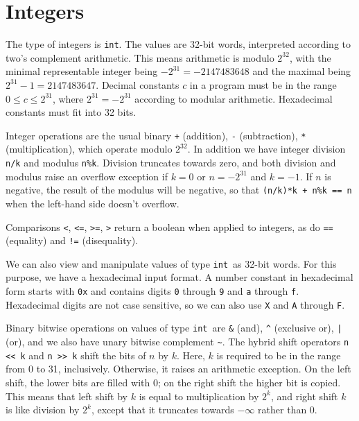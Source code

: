 \documentclass[11pt]{article}
\newcommand{\tint}{\texttt{int}}
\begin{document}
\section{Integers}

The type of integers is \tint.  The values are 32-bit words,
interpreted according to two's complement arithmetic.  This means
arithmetic is modulo $2^{32}$, with the minimal representable integer
being $-2^{31} = -2147483648$ and the maximal being $2^{31}-1 = 2147483647$.
Decimal constants $c$ in a program must be in the range $0 \leq c
\leq 2^{31}$, where $2^{31} = -2^{31}$ according to modular
arithmetic.  Hexadecimal constants must fit into 32 bits.

Integer operations are the usual binary \lstinline'+' (addition), \lstinline'-'
(subtraction), \lstinline'*' (multiplication), which operate modulo
$2^{32}$.  In addition we have integer division \lstinline'n/k' and modulus
\lstinline'n%k'.  Division truncates towards zero, and
both division and modulus raise an overflow exception if $k = 0$ or $n
= -2^{31}$ and $k = -1$.  If $n$ is negative, the result of the
modulus will be negative, so that \lstinline'(n/k)*k + n%k == n' when the
left-hand side doesn't overflow.

Comparisons \lstinline'<', \lstinline'<=', \lstinline'>=', \lstinline'>' return
a boolean when applied to integers, as do \lstinline'==' (equality)
and \lstinline'!=' (disequality).

We can also view and manipulate values of type \tint\ as 32-bit words.
For this purpose, we have a hexadecimal input format.  A number
constant in hexadecimal form starts with \lstinline'0x' and contains digits
\lstinline'0' through \lstinline'9' and \lstinline'a' through \lstinline'f'.  Hexadecimal
digits are not case sensitive, so we can also use \lstinline'X' and
\lstinline'A' through \lstinline'F'.

Binary bitwise operations on values of type \tint\ are \lstinline'&' (and),
\lstinline'^' (exclusive or), \lstinline'|' (or), and we also have unary bitwise
complement \lstinline'~'.  The hybrid shift operators \lstinline'n << k' and
\lstinline'n >> k' shift the bits of $n$ by $k$.  Here, $k$ is required to
be in the range from 0 to 31, inclusively.  Otherwise, it raises an
arithmetic exception.  On the left shift, the lower bits are filled
with 0; on the right shift the higher bit is copied.  This means that
left shift by $k$ is equal to multiplication by $2^k$, and right shift
$k$ is like division by $2^k$, except that it truncates towards
$-\infty$ rather than $0$.
\end{document}
